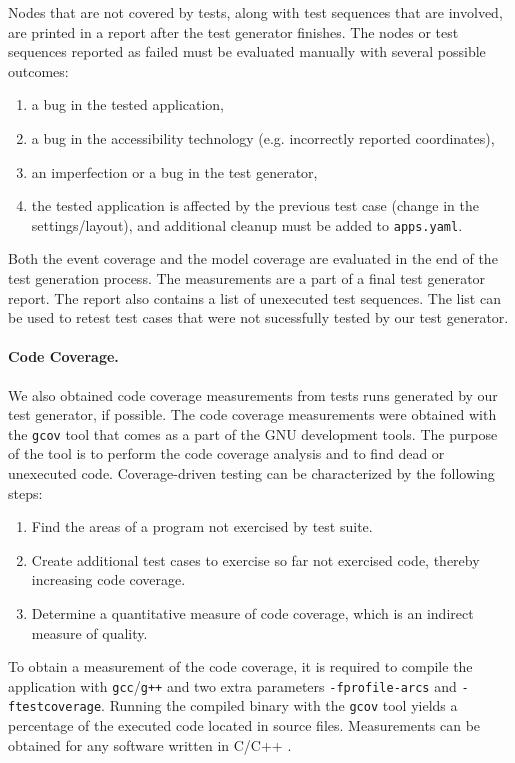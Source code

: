 Nodes that are not covered by tests, along with test sequences that are involved, are printed in a report after the test generator finishes. The nodes or test sequences reported as failed must be evaluated manually with several possible outcomes:

\begin{enumerate}
    \item a bug in the tested application,
    \item a bug in the accessibility technology (e.g. incorrectly reported coordinates),
    \item an imperfection or a bug in the test generator,
    \item the tested application is affected by the previous test case (change in the settings/layout), and additional cleanup must be added to \texttt{apps.yaml}.
\end{enumerate}

Both the event coverage and the model coverage are evaluated in the end of the test generation process. The measurements are a part of a final test generator report. The report also contains a list of unexecuted test sequences. The list can be used to retest test cases that were not sucessfully tested by our test generator.

\paragraph{Code Coverage.} We also obtained code coverage measurements from tests runs generated by our test generator, if possible. The code coverage measurements were obtained with the \verb|gcov| tool that comes as a part of the GNU development tools. The purpose of the tool is to perform the code coverage analysis and to find dead or unexecuted code. Coverage-driven testing can be characterized by the following steps: 
\begin{enumerate}
  \item Find the areas of a program not exercised by test suite.
  \item Create additional test cases to exercise so far not exercised code, thereby increasing code coverage.
  \item Determine a quantitative measure of code coverage, which is an indirect measure of quality.
\end{enumerate}

To obtain a measurement of the code coverage, it is required to compile the application with \verb|gcc|/\verb|g++| and two extra parameters \verb|-fprofile-arcs| and \verb|-ftestcoverage|. Running the compiled binary with the \verb|gcov| tool yields a percentage of the executed code located in source files. Measurements can be obtained for any software written in C/C++ \cite{gcov}.

